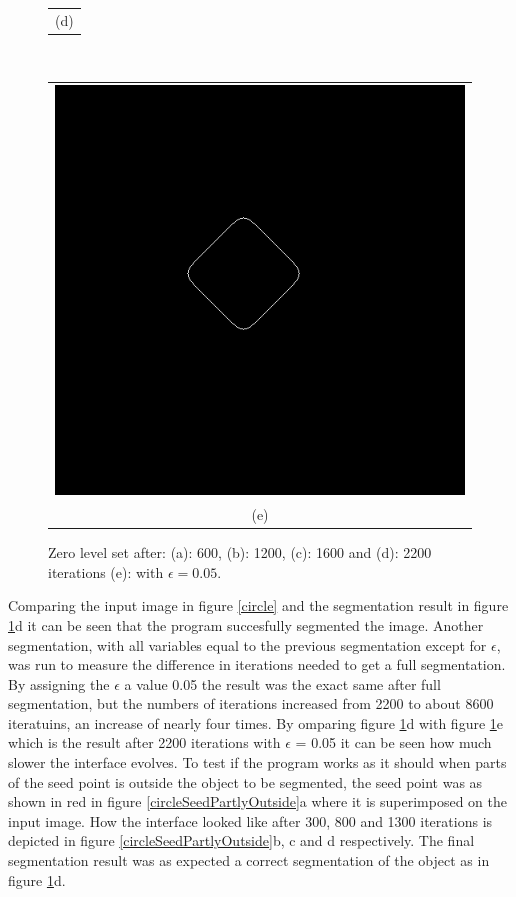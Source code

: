 \begin{figure}[h!]
\begin{minipage}{.49\textwidth}
\begin{tabular}{c}
(d)
\end{tabular}
\end{minipage}
\\
\begin{minipage}{.49\textwidth}
\begin{tabular}{c}
\includegraphics[width=.9\textwidth]{results/2D/circleEps005} \\
(e)
\end{tabular}
\end{minipage}
\caption{Zero level set after: (a): 600, (b): 1200, (c): 1600 and (d): 2200 iterations (e): with $\epsilon=0.05$.}
\label{circleZeroMany}
\end{figure}
Comparing the input image in figure \ref{circle} and the segmentation result in figure \ref{circleZeroMany}d it can be seen that the program succesfully segmented the image.
Another segmentation, with all variables equal to the previous segmentation except for $\epsilon$, was run to measure the difference in iterations needed to get a full segmentation. By assigning the $\epsilon$ a value 0.05 the result was the exact same after full segmentation, but the numbers of iterations increased from 2200 to about 8600 iteratuins, an increase of nearly four times. By omparing figure \ref{circleZeroMany}d with figure \ref{circleZeroMany}e which is the result after 2200 iterations with $\epsilon$ = 0.05 it can be seen how much slower the interface evolves.
To test if the program works as it should when parts of the seed point is outside the object to be segmented, the seed point was as shown in red in figure \ref{circleSeedPartlyOutside}a where it is superimposed on the input image. How the interface looked like after 300, 800 and 1300 iterations is depicted in figure \ref{circleSeedPartlyOutside}b, c and d respectively. The final segmentation result was as expected a correct segmentation of the object as in figure \ref{circleZeroMany}d. 
